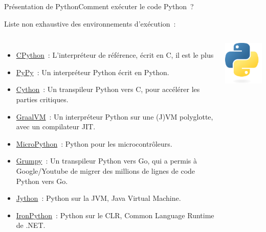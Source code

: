 \documentclass{beamer}
\begin{document}
    \begin{frame}{Présentation de Python}{Comment exécuter le code Python~?}
        \begin{footnotesize}
            Liste non exhaustive des environnements d'exécution~:
            \begin{columns}
                \begin{itemize}
                    \item \href{https://github.com/python/cpython}{CPython}~: L'interpréteur de référence, écrit en C, il est le plus
                    \item \href{https://pypy.org/}{PyPy}~: Un interpréteur Python écrit en Python.
                    \item \href{https://cython.org/}{Cython}~: Un transpileur Python vers C, pour accélérer les parties critiques.
                    \item \href{https://www.graalvm.org/python/}{GraalVM}~: Un interpréteur Python sur une (J)VM polyglotte, avec un compilateur JIT.
                    \item \href{https://micropython.org/}{MicroPython}~: Python pour les microcontrôleurs.
                    \item \href{https://github.com/google/grumpy}{Grumpy}~: Un transpileur Python vers Go, qui a permis à Google/Youtube de migrer des millions de lignes de code Python vers Go.
                    \item \href{https://www.jython.org/}{Jython}~: Python sur la JVM, Java Virtual Machine.
                    \item \href{https://ironpython.net/}{IronPython}~: Python sur le CLR, Common Language Runtime de .NET.
                \end{itemize}
                \centering
                \includegraphics[width=4cm]{image/python-logo}
            \end{columns}
        \end{footnotesize}
    \end{frame}
\end{document}
